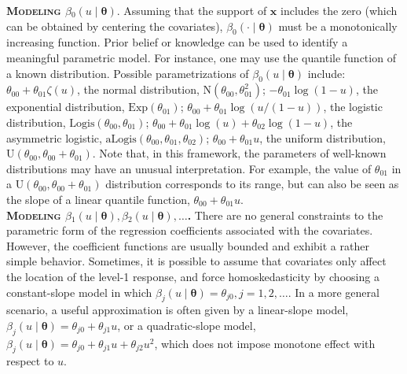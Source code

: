 \documentclass[12pt]{article}
\def\thetavec{\bm{\theta}}
\def\xx{\bm{x}}
\begin{document}
\textbf{\textsc{Modeling $\beta_0(u \mid \thetavec)$}}. 
Assuming that the support of $\xx$ includes the zero (which can be obtained by centering the covariates), 
$\beta_0(\cdot \mid \thetavec)$ must be a monotonically increasing function.
Prior belief or knowledge can be used to identify a meaningful parametric model. 
For instance, one may use the quantile function of a known distribution. Possible parametrizations of $\beta_0(u \mid \thetavec)$ include:
$\theta_{00} + \theta_{01}\zeta(u)$, the normal distribution, $\text{N}(\theta_{00}, \theta_{01}^2)$;
$-\theta_{01}\log(1 - u)$, the exponential distribution, $\text{Exp}(\theta_{01})$;
$\theta_{00} + \theta_{01}\log(u/(1 - u))$, the logistic distribution, $\text{Logis}(\theta_{00}, \theta_{01})$;
$\theta_{00} + \theta_{01}\log(u) + \theta_{02}\log(1 - u)$, the asymmetric logistic, $\text{aLogis}(\theta_{00}, \theta_{01}, \theta_{02})$;
$\theta_{00} + \theta_{01}u$, the uniform distribution, $\text{U}(\theta_{00}, \theta_{00} + \theta_{01})$.
Note that, in this framework, the parameters of well-known distributions may have
an unusual interpretation. For example, the value of $\theta_{01}$ in a $\text{U}(\theta_{00}, \theta_{00} + \theta_{01})$
distribution corresponds to its range, but can also be seen as the slope of a linear quantile function, $\theta_{00} + \theta_{01}u$.\vspace{0.3cm}\\ 
\textbf{\textsc{Modeling $\beta_1(u \mid \thetavec), \beta_2(u \mid \thetavec), \ldots$.}} 
There are no general constraints to the parametric form of the regression coefficients associated with the covariates.
However, the coefficient functions are usually bounded and exhibit a rather simple behavior.
Sometimes, it is possible to assume that covariates only affect the location of the level-1 response, and force homoskedasticity by choosing
a constant-slope model in which $\beta_j(u \mid \thetavec) = \theta_{j0},  j = 1, 2, \ldots$. 
In a more general scenario, a useful approximation is often given by a linear-slope model, 
$\beta_j(u \mid \thetavec) = \theta_{j0} + \theta_{j1}u$, or a quadratic-slope model, $\beta_j(u \mid \thetavec) = \theta_{j0} + \theta_{j1}u + \theta_{j2}u^2$, which does not impose monotone effect with respect to $u$.\vspace{0.3cm}\\ 
\end{document}
